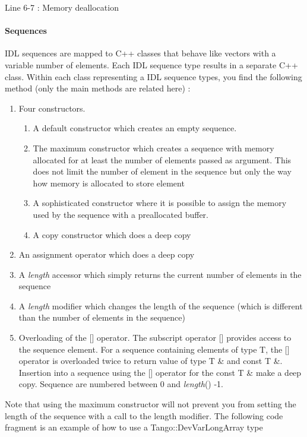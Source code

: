 Line 6-7 : Memory deallocation


\paragraph{Sequences}

IDL sequences are mapped to C++ classes that behave
like vectors with a variable number of elements. Each IDL sequence
type results in a separate C++ class. Within each class representing
a IDL sequence types, you find the following method (only the main
methods are related here) :
\begin{enumerate}
\item Four constructors. 

\begin{enumerate}
\item A default constructor which creates an empty sequence.
\item The maximum constructor which creates a sequence with memory allocated
for at least the number of elements passed as argument. This does
not limit the number of element in the sequence but only the way how
memory is allocated to store element
\item A sophisticated constructor where it is possible to assign the memory
used by the sequence with a preallocated buffer.
\item A copy constructor which does a deep copy
\end{enumerate}
\item An assignment operator which does a deep copy
\item A \emph{length} accessor which simply returns the current number of
elements in the sequence
\item A \emph{length} modifier which changes the length of
the sequence (which is different than the number of elements in the
sequence)
\item Overloading of the {[}{]} operator. The subscript operator {[}{]}
provides access to the sequence element. For a sequence containing
elements of type T, the {[}{]} operator is overloaded twice to return
value of type T \& and const T \&. Insertion into a sequence using
the {[}{]} operator for the const T \& make a deep copy. Sequence
are numbered between 0 and \emph{length}() -1.
\end{enumerate}
Note that using the maximum constructor will not prevent you from
setting the length of the sequence with a call to the length modifier.
The following code fragment is an example of how to use a Tango::DevVarLongArray
type


